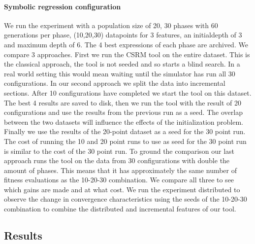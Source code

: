 \paragraph{Symbolic regression configuration}
We run the experiment with a population size of 20, 30 phases with 60 generations per phase, (10,20,30) datapoints for 3 features, an initialdepth of 3 and maximum depth of 6. The 4 best expressions of each phase are archived.
We compare 3 approaches. First we run the CSRM tool on the entire dataset. This is the classical approach, the tool is not seeded and so starts a blind search. In a real world setting this would mean waiting until the simulator has run all 30 configurations.
In our second approach we split the data into incremental sections. After 10 configurations have completed we start the tool on this dataset. 
The best 4 results are saved to disk, then we run the tool with the result of 20 configurations and use the results from the previous run as a seed. The overlap between the two datasets will influence the effects of the initialization problem. Finally we use the results of the 20-point dataset as a seed for the 30 point run. 
The cost of running the 10 and 20 point runs to use as seed for the 30 point run is similar to the cost of the 30 point run. 
To ground the comparison our last approach runs the tool on the data from 30 configurations with double the amount of phases. This means that it has approximately the same number of fitness evaluations as the 10-20-30 combination. We compare all three to see which gains are made and at what cost.
We run the experiment distributed to observe the change in convergence characteristics using the seeds of the 10-20-30 combination to combine the distributed and incremental features of our tool.
\subsection{Results}
